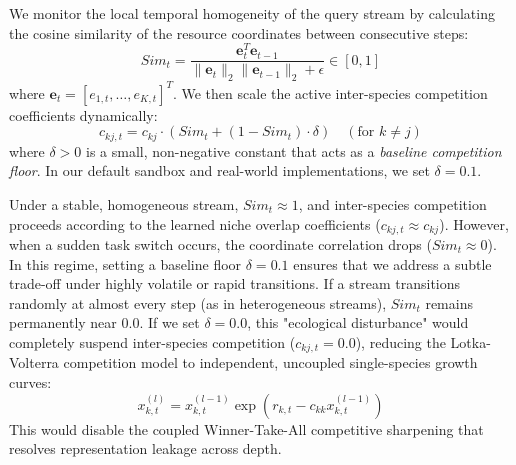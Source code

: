 We monitor the local temporal homogeneity of the query stream by calculating the cosine similarity of the resource coordinates between consecutive steps:
\begin{equation}
    Sim_t = \frac{\mathbf{e}_t^T \mathbf{e}_{t-1}}{\|\mathbf{e}_t\|_2 \|\mathbf{e}_{t-1}\|_2 + \epsilon} \in [0, 1]
\end{equation}
where $\mathbf{e}_t = [e_{1, t}, \dots, e_{K, t}]^T$. We then scale the active inter-species competition coefficients dynamically:
\begin{equation}
    c_{kj, t} = c_{kj} \cdot \left( Sim_t + (1 - Sim_t) \cdot \delta \right) \quad (\text{for } k \neq j)
\end{equation}
where $\delta > 0$ is a small, non-negative constant that acts as a \emph{baseline competition floor}. In our default sandbox and real-world implementations, we set $\delta = 0.1$. 

Under a stable, homogeneous stream, $Sim_t \approx 1$, and inter-species competition proceeds according to the learned niche overlap coefficients ($c_{kj, t} \approx c_{kj}$). However, when a sudden task switch occurs, the coordinate correlation drops ($Sim_t \approx 0$). In this regime, setting a baseline floor $\delta = 0.1$ ensures that we address a subtle trade-off under highly volatile or rapid transitions. If a stream transitions randomly at almost every step (as in heterogeneous streams), $Sim_t$ remains permanently near $0.0$. If we set $\delta = 0.0$, this "ecological disturbance" would completely suspend inter-species competition ($c_{kj, t} = 0.0$), reducing the Lotka-Volterra competition model to independent, uncoupled single-species growth curves:
\begin{equation}
    x_{k, t}^{(l)} = x_{k, t}^{(l-1)} \exp\left( r_{k, t} - c_{kk} x_{k, t}^{(l-1)} \right)
\end{equation}
This would disable the coupled Winner-Take-All competitive sharpening that resolves representation leakage across depth. 

